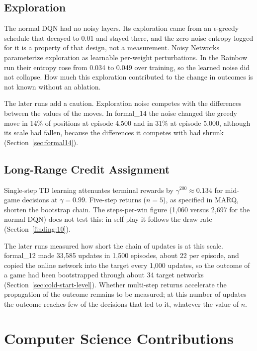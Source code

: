 \subsection{Exploration}

The normal DQN had no noisy layers. Its exploration came from an $\epsilon$-greedy schedule that decayed to 0.01 and stayed there, and the zero noise entropy logged for it is a property of that design, not a measurement. Noisy Networks \cite{NoisyNetworks} parameterize exploration as learnable per-weight perturbations. In the Rainbow run their entropy rose from 0.034 to 0.049 over training, so the learned noise did not collapse. How much this exploration contributed to the change in outcomes is not known without an ablation.

The later runs add a caution. Exploration noise competes with the differences between the values of the moves. In formal\_14 the noise changed the greedy move in 14\% of positions at episode 4,500 and in 31\% at episode 5,000, although its scale had fallen, because the differences it competes with had shrunk (Section~\ref{sec:formal14}).

\subsection{Long-Range Credit Assignment}

Single-step TD learning attenuates terminal rewards by $\gamma^{200} \approx 0.134$ for mid-game decisions at $\gamma = 0.99$. Five-step returns ($n = 5$), as specified in MARQ, shorten the bootstrap chain. The steps-per-win figure (1,060 versus 2,697 for the normal DQN) does not test this: in self-play it follows the draw rate (Section~\ref{finding:10}).

The later runs measured how short the chain of updates is at this scale. formal\_12 made 33,585 updates in 1,500 episodes, about 22 per episode, and copied the online network into the target every 1,000 updates, so the outcome of a game had been bootstrapped through about 34 target networks (Section~\ref{sec:cold-start-level}). Whether multi-step returns accelerate the propagation of the outcome remains to be measured; at this number of updates the outcome reaches few of the decisions that led to it, whatever the value of $n$.

\section{Computer Science Contributions}

